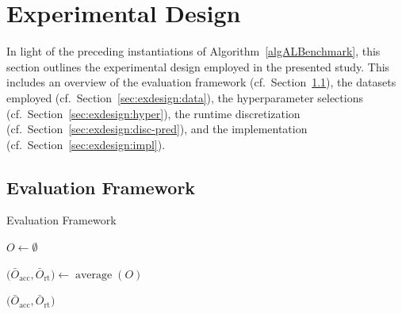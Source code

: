 \documentclass[sn-basic, Numbered]{sn-jnl} %
\begin{document}
\section{Experimental Design}
\label{sec:exdesign}

In light of the preceding instantiations of Algorithm~\ref{algALBenchmark}, this section outlines the experimental design employed in the presented study.
This includes an overview of the evaluation framework (cf.~Section~\ref{sec:exdesign:eval}), the datasets employed (cf.~Section~\ref{sec:exdesign:data}), the hyperparameter selections (cf.~Section~\ref{sec:exdesign:hyper}), the runtime discretization (cf.~Section~\ref{sec:exdesign:disc-pred}), and the implementation (cf.~Section~\ref{sec:exdesign:impl}).

\subsection{Evaluation Framework}
\label{sec:exdesign:eval}

\begin{algorithm}[tb]
  \caption{Evaluation Framework}
  \label{alg:eval}

  \BlankLine

  $O \leftarrow \emptyset$


  $\bigl( \bar{O}_{\operatorname{acc}}, \bar{O}_{\operatorname{rt}} \bigr) \leftarrow \operatorname{average}(O)$ \;
  
  \Return $\bigl( \bar{O}_{\operatorname{acc}}, \bar{O}_{\operatorname{rt}} \bigr)$
\end{algorithm}
\end{document}
